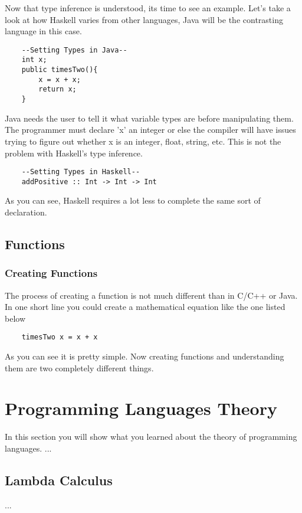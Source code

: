 \documentclass{article}
\begin{document}
    \medskip\noindent Now that type inference is understood, its time to see an example. Let's take a look at how Haskell varies from other languages, Java will be the contrasting language in this case.
    \begin{lstlisting}
    --Setting Types in Java--
    int x;
    public timesTwo(){
        x = x + x;
        return x;
    }
    \end{lstlisting}
    
    \medskip
    Java needs the user to tell it what variable types are before manipulating them. The programmer must declare 'x' an integer or else the compiler will have issues trying to figure out whether x is an integer, float, string, etc. This is not the problem with Haskell's type inference.
    
    \begin{lstlisting}
    --Setting Types in Haskell--
    addPositive :: Int -> Int -> Int
    \end{lstlisting}
    
    As you can see, Haskell requires a lot less to complete the same sort of declaration.
    
\subsection{Functions}
    
    \subsubsection{Creating Functions}
    The process of creating a function is not much different than in C/C++ or Java. In one short line you could create a mathematical equation like the one listed below
    
    \begin{lstlisting}
    timesTwo x = x + x 
    \end{lstlisting}
    
    \medskip
    As you can see it is pretty simple. Now creating functions and understanding them are two completely different things. 


\section{Programming Languages Theory}

In this section you will show what you learned about the theory of programming languages. ...
\subsection{Lambda Calculus}
...
\end{document}
